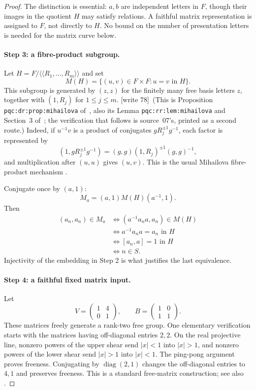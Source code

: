 \documentclass[11pt,letterpaper]{article}
\theoremstyle{definition}
\theoremstyle{remark}
\newcommand{\diag}{\operatorname{diag}}
\newcommand{\wtagb}{\textup{[write 78]}}
\begin{document}
\begin{proof}
The distinction is essential: $a,b$ are independent letters in $F$, though their images in the quotient $H$ may satisfy relations. A faithful matrix representation is assigned to $F$, not directly to $H$. No bound on the number of presentation letters is needed for the matrix curve below.

\paragraph{Step 3: a fibre-product subgroup.}
Let $H=F/\langle\!\langle R_1,\ldots,R_m\rangle\!\rangle$ and set
\[
 M(H)=\{(u,v)\in F\times F:u=v\text{ in }H\}.
\]
This subgroup is generated by $(z,z)$ for the finitely many free basis letters $z$, together with $(1,R_j)$ for $1\le j\le m$. \wtagb\ (This is Proposition \texttt{pqc:dr:prop:mihailova} of~\cite{pqc}, also its Lemma \texttt{pqc:rr:lem:mihailova} and Section~3 of~\cite{repo-comm}; the verification that follows is source~07's, printed as a second route.) Indeed, if $u^{-1}v$ is a product of conjugates $gR_j^{\pm1}g^{-1}$, each factor is represented by
\[
 (1,gR_j^{\pm1}g^{-1})=(g,g)(1,R_j)^{\pm1}(g,g)^{-1},
\]
and multiplication after $(u,u)$ gives $(u,v)$. This is the usual Mihailova fibre-product mechanism \cite{ai-bogopolski}.

Conjugate once by $(a,1)$:
\[
 M_a=(a,1)M(H)(a^{-1},1).
\]
Then
\begin{align*}
 (a_n,a_n)\in M_a
 &\Longleftrightarrow (a^{-1}a_n a,a_n)\in M(H)\\
 &\Longleftrightarrow a^{-1}a_n a=a_n\text{ in }H\\
 &\Longleftrightarrow [a_n,a]=1\text{ in }H\\
 &\Longleftrightarrow n\in S.
\end{align*}
Injectivity of the embedding in Step 2 is what justifies the last equivalence.

\paragraph{Step 4: a faithful fixed matrix input.}
Let
\[
 V=\begin{pmatrix}1&4\\0&1\end{pmatrix},\qquad
 B=\begin{pmatrix}1&0\\1&1\end{pmatrix}.
\]
These matrices freely generate a rank-two free group. One elementary verification starts with the matrices having off-diagonal entries $2,2$. On the real projective line, nonzero powers of the upper shear send $|x|<1$ into $|x|>1$, and nonzero powers of the lower shear send $|x|>1$ into $|x|<1$. The ping-pong argument proves freeness. Conjugating by $\diag(2,1)$ changes the off-diagonal entries to $4,1$ and preserves freeness. This is a standard free-matrix construction; see also \cite{ai-chang}.


\end{proof}
\end{document}
